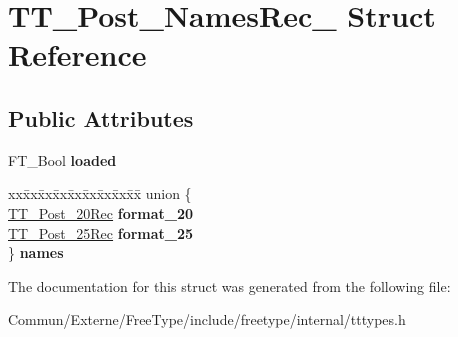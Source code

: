 \hypertarget{struct_t_t___post___names_rec__}{}\section{T\+T\+\_\+\+Post\+\_\+\+Names\+Rec\+\_\+ Struct Reference}
\label{struct_t_t___post___names_rec__}
\subsection*{Public Attributes}
\begin{DoxyCompactItemize}
\item 
F\+T\+\_\+\+Bool {\bfseries loaded}\hypertarget{struct_t_t___post___names_rec___a8878ac4555c3df60958869f0d53383c9}{}\label{struct_t_t___post___names_rec___a8878ac4555c3df60958869f0d53383c9}

\item 
\begin{tabbing}
xx\=xx\=xx\=xx\=xx\=xx\=xx\=xx\=xx\=\kill
union \{\\
\>\hyperlink{struct_t_t___post__20_rec__}{TT\_Post\_20Rec} {\bfseries format\_20}\\
\>\hyperlink{struct_t_t___post__25__}{TT\_Post\_25Rec} {\bfseries format\_25}\\
\} {\bfseries names}\hypertarget{struct_t_t___post___names_rec___a6588c0cf135465501f71286c47470937}{}\label{struct_t_t___post___names_rec___a6588c0cf135465501f71286c47470937}
\\

\end{tabbing}\end{DoxyCompactItemize}


The documentation for this struct was generated from the following file\+:\begin{DoxyCompactItemize}
\item 
Commun/\+Externe/\+Free\+Type/include/freetype/internal/tttypes.\+h\end{DoxyCompactItemize}
